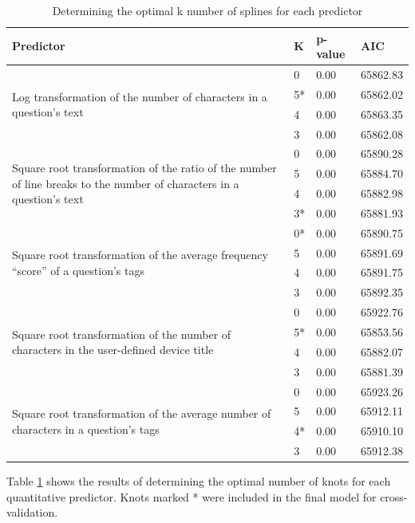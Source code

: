 \documentclass{article}
\begin{document}
\begin{table}[ht]
\centering
\caption{Determining the optimal k number of splines for each predictor} 
\begin{tabular}{| p{5cm} | l | l | l |}
  \hline
  Predictor & K & p-value & AIC \\ 
  \hline
  \multirow{ 4 }{ 5cm }{Log transformation of the number of characters in a question's text} 
  & 0 & 0.00 & 65862.83 \\ 
  & 5* & 0.00 & 65862.02 \\ 
  & 4 & 0.00 & 65863.35 \\ 
  & 3 & 0.00 & 65862.08 \\ 
  \hline
  \multirow{ 4 }{ 5 cm }{Square root transformation of the ratio of the number of line breaks to the number of characters in a question's text}
  & 0 & 0.00 & 65890.28 \\ 
  & 5 & 0.00 & 65884.70 \\ 
  & 4 & 0.00 & 65882.98 \\ 
  & 3* & 0.00 & 65881.93 \\ 
  \hline
  \multirow{ 4 }{ 5 cm }{Square root transformation of the average frequency ``score'' of a question's tags}
  & 0* & 0.00 & 65890.75 \\ 
  & 5 & 0.00 & 65891.69 \\ 
  & 4 & 0.00 & 65891.75 \\ 
  & 3 & 0.00 & 65892.35 \\ 
  \hline
  \multirow{ 4 }{ 5 cm }{Square root transformation of the number of characters in the user-defined device title}
  & 0 & 0.00 & 65922.76 \\ 
  & 5* & 0.00 & 65853.56 \\ 
  & 4 & 0.00 & 65882.07 \\ 
  & 3 & 0.00 & 65881.39 \\ 
  \hline
  \multirow{ 4 }{ 5 cm }{Square root transformation of the average number of characters in a question's tags}
  & 0 & 0.00 & 65923.26 \\ 
  & 5 & 0.00 & 65912.11 \\ 
  & 4* & 0.00 & 65910.10 \\ 
  & 3 & 0.00 & 65912.38 \\ 
   \hline
\end{tabular}
\label{table:splines}
\end{table}

Table \ref{table:splines} shows the results of determining the optimal number of knots for each quantitative predictor. Knots marked * were included in the final model for cross-validation. 
\end{document}
